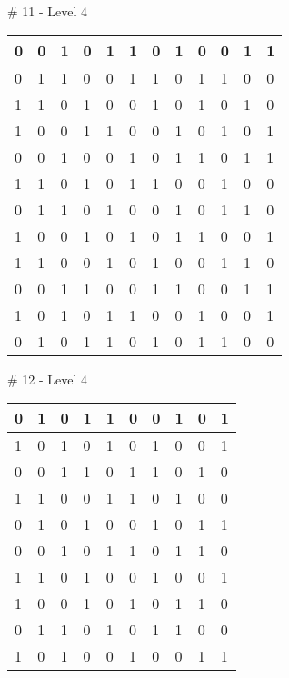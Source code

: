 \# 11 - Level 4 \newline
\begin{tabular}{|m{\collen}|m{\collen}|m{\collen}|m{\collen}|m{\collen}|m{\collen}|m{\collen}|m{\collen}|m{\collen}|m{\collen}|m{\collen}|m{\collen}|}
\hline
  0 & 0 & 1 & 0 & 1 & 1 & 0 & 1 & 0 & 0 & 1 & 1 \\
\hline
  0 & 1 & 1 & 0 & 0 & 1 & 1 & 0 & 1 & 1 & 0 & 0 \\
\hline
  1 & 1 & 0 & 1 & 0 & 0 & 1 & 0 & 1 & 0 & 1 & 0 \\
\hline
  1 & 0 & 0 & 1 & 1 & 0 & 0 & 1 & 0 & 1 & 0 & 1 \\
\hline
  0 & 0 & 1 & 0 & 0 & 1 & 0 & 1 & 1 & 0 & 1 & 1 \\
\hline
  1 & 1 & 0 & 1 & 0 & 1 & 1 & 0 & 0 & 1 & 0 & 0 \\
\hline
  0 & 1 & 1 & 0 & 1 & 0 & 0 & 1 & 0 & 1 & 1 & 0 \\
\hline
  1 & 0 & 0 & 1 & 0 & 1 & 0 & 1 & 1 & 0 & 0 & 1 \\
\hline
  1 & 1 & 0 & 0 & 1 & 0 & 1 & 0 & 0 & 1 & 1 & 0 \\
\hline
  0 & 0 & 1 & 1 & 0 & 0 & 1 & 1 & 0 & 0 & 1 & 1 \\
\hline
  1 & 0 & 1 & 0 & 1 & 1 & 0 & 0 & 1 & 0 & 0 & 1 \\
\hline
  0 & 1 & 0 & 1 & 1 & 0 & 1 & 0 & 1 & 1 & 0 & 0 \\
\hline
\end{tabular}


\smallskip

\# 12 - Level 4 \newline
\begin{tabular}{|m{\collen}|m{\collen}|m{\collen}|m{\collen}|m{\collen}|m{\collen}|m{\collen}|m{\collen}|m{\collen}|m{\collen}|}
\hline
  0 & 1 & 0 & 1 & 1 & 0 & 0 & 1 & 0 & 1 \\
\hline
  1 & 0 & 1 & 0 & 1 & 0 & 1 & 0 & 0 & 1 \\
\hline
  0 & 0 & 1 & 1 & 0 & 1 & 1 & 0 & 1 & 0 \\
\hline
  1 & 1 & 0 & 0 & 1 & 1 & 0 & 1 & 0 & 0 \\
\hline
  0 & 1 & 0 & 1 & 0 & 0 & 1 & 0 & 1 & 1 \\
\hline
  0 & 0 & 1 & 0 & 1 & 1 & 0 & 1 & 1 & 0 \\
\hline
  1 & 1 & 0 & 1 & 0 & 0 & 1 & 0 & 0 & 1 \\
\hline
  1 & 0 & 0 & 1 & 0 & 1 & 0 & 1 & 1 & 0 \\
\hline
  0 & 1 & 1 & 0 & 1 & 0 & 1 & 1 & 0 & 0 \\
\hline
  1 & 0 & 1 & 0 & 0 & 1 & 0 & 0 & 1 & 1 \\
\hline
\end{tabular}


